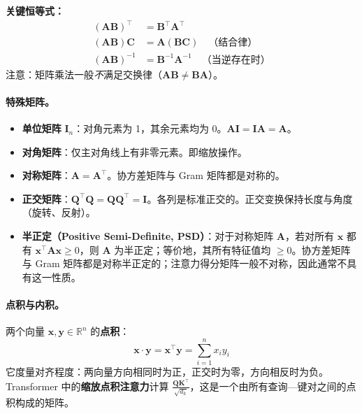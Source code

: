 \textbf{关键恒等式：}
\begin{align}
(\mathbf{A}\mathbf{B})^\top &= \mathbf{B}^\top\mathbf{A}^\top \\
(\mathbf{A}\mathbf{B})\mathbf{C} &= \mathbf{A}(\mathbf{B}\mathbf{C}) \quad \text{（结合律）} \\
(\mathbf{A}\mathbf{B})^{-1} &= \mathbf{B}^{-1}\mathbf{A}^{-1} \quad \text{（当逆存在时）}
\end{align}
注意：矩阵乘法一般\emph{不}满足交换律（$\mathbf{A}\mathbf{B} \neq \mathbf{B}\mathbf{A}$）。

\paragraph{特殊矩阵。}
\begin{itemize}
  \item \textbf{单位矩阵} $\mathbf{I}_n$：对角元素为 1，其余元素均为 0。$\mathbf{A}\mathbf{I} = \mathbf{I}\mathbf{A} = \mathbf{A}$。
  \item \textbf{对角矩阵}：仅主对角线上有非零元素。即缩放操作。
  \item \textbf{对称矩阵}：$\mathbf{A} = \mathbf{A}^\top$。协方差矩阵与 Gram 矩阵都是对称的。
  \item \textbf{正交矩阵}：$\mathbf{Q}^\top\mathbf{Q} = \mathbf{Q}\mathbf{Q}^\top = \mathbf{I}$。各列是标准正交的。正交变换保持长度与角度（旋转、反射）。
  \item \textbf{半正定（Positive Semi-Definite, PSD）}：对于对称矩阵 $\mathbf{A}$，若对所有 $\mathbf{x}$ 都有 $\mathbf{x}^\top\mathbf{A}\mathbf{x} \geq 0$，则 $\mathbf{A}$ 为半正定；等价地，其所有特征值均 $\geq 0$。协方差矩阵与 Gram 矩阵都是对称半正定的；注意力得分矩阵一般不对称，因此通常不具有这一性质。
\end{itemize}

\paragraph{点积与内积。}
两个向量 $\mathbf{x}, \mathbf{y} \in \mathbb{R}^n$ 的\textbf{点积}：
\[
\mathbf{x} \cdot \mathbf{y} = \mathbf{x}^\top \mathbf{y} = \sum_{i=1}^n x_i y_i
\]
它度量对齐程度：两向量方向相同时为正，正交时为零，方向相反时为负。Transformer 中的\textbf{缩放点积注意力}计算 $\frac{\mathbf{Q}\mathbf{K}^\top}{\sqrt{d_k}}$，这是一个由所有查询—键对之间的点积构成的矩阵。

